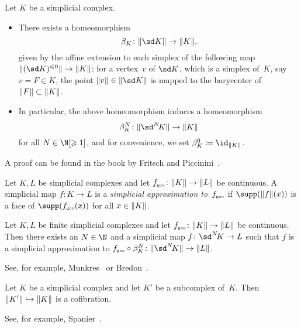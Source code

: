 \begin{thProposition}
    Let $K$ be a simplicial complex. 
    \begin{itemize}
        \item
            There exists a homeomorphism
            \[ \beta_K\colon \geom{\sd K} \to \geom{K}  , \]
            given by the affine extension to each simplex of the following map
            $\geom{(\sd K)^{\leq 0}}\to\geom{K}$: for a vertex~$v$ of $\sd K$,
            which is a simplex of~$K$, say $v = F\in K$, the point
            $\geom{v}\in\geom{\sd K}$ is mapped to the barycenter of
            $\lVert F\rVert\subset\lVert K\rVert$.
            
        \item
            In particular, the above homeomorphism induces a homeomorphism
            \[ \beta_K^N\colon\geom{\sdNK}\to\geom{K} \]
            for all $N\in\N[\geq1]$, and for convenience, we set
            $\beta_K^0 \defeq \id_{\geom K}$.
    \end{itemize}
\end{thProposition}

A proof can be found in the book by Fritsch and
Piccinini~\cite[Proposition~3.3.16]{bookc:fritschpiccinini90}.

\begin{thDef}
    Let $K,L$ be simplicial complexes and let $f_{\scriptscriptstyle\mathrm{geo}}\colon\lVert K\rVert\to\lVert L\rVert$
    be continuous.  A simplicial map $f\colon K\to L$ is a \emph{simplicial
    approximation to~$f_{\scriptscriptstyle\mathrm{geo}}$} if $\supp(\geom{f}(x))$ is a face of
    $\supp(f_\geo(x))$ for all $x\in\lVert K\rVert$.
\end{thDef}

\begin{thTheorem}
    \label{ch1:simpapprox}
    Let $K,L$ be finite simplicial complexes and let
    $f_{\scriptscriptstyle\mathrm{geo}}\colon\lVert K\rVert\to\lVert L\rVert$ be continuous.
    Then there exists an $N\in\N$ and a simplicial map $f\colon\sdNK\to L$
    such that $f$ is a simplicial approximation to
    $f_\geo\after\beta_K^N\colon\geom{\sdNK}\to\geom L$.
\end{thTheorem}
%
See, for example,
Munkres~\cite[Theorem~16.1]{bookc:munkres84}
or Bredon~\cite[Theorem~22.10]{bookc:bredon93}.

\begin{thLemma}
    \label{ch1:inclcofibration}
    Let $K$ be a simplicial complex and let $K'$ be a subcomplex
    of~$K$. Then $\lVert K'\rVert\hookrightarrow\lVert K\rVert$ is a cofibration.
\end{thLemma}
%
See, for example, Spanier~\cite[Ch.~3,\;Sec.~2,\;Corollary~5]{bookc:spanier66}.
